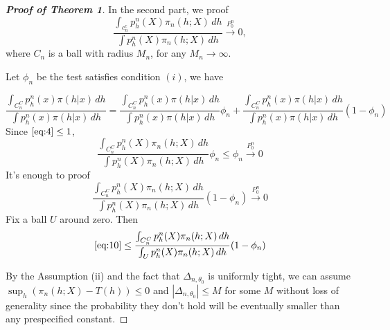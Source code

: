 \begin{proof}[\textbf{Proof of Theorem 1}]
In the second part, we proof
\begin{equation}\label{eq:4}
    \frac{\int_{c_n^c}p_h^n(X)\pi_n(h;X)\, dh}{\int p_h^n(X)\pi_n(h;X)\, dh}\xrightarrow{P_0^n}0,
\end{equation}
where $C_n$ is a ball with radius $M_n$, for any $M_n\to \infty$.
    
    Let $\phi_n$ be the test satisfies condition $(i)$, we have

\begin{equation}
    \frac{\int_{C_n^C}p_h^n(x)\pi(h|x)\, dh}{\int p_h^n(x)\pi(h|x)\, dh}= \frac{\int_{C_n^C}p_h^n(x)\pi(h|x)\, dh}{\int p_h^n(x)\pi(h|x)\, dh}\phi_n+ \frac{\int_{C_n^C}p_h^n(x)\pi(h|x)\, dh}{\int p_h^n(x)\pi(h|x)\, dh}(1-\phi_n)
\end{equation}
Since $\eqref{eq:4}\leq 1$, 
\begin{equation}
    \frac{\int_{C_n^C}p_h^n(X)\pi_n(h;X)\, dh}{\int p_h^n(X)\pi_n(h;X)\, dh}\phi_n\leq \phi_n\xrightarrow{P_0^n}0
\end{equation}
It's enough to proof
\begin{equation}\label{eq:10}
    \frac{\int_{C_n^C}p_h^n(X)\pi_n(h;X)\, dh}{\int p_h^n(X)\pi_n(h;X)\, dh}(1-\phi_n)\xrightarrow{P_0^n}0
\end{equation}
Fix a ball $U$ around zero. Then
\begin{equation}\label{eq:11}
\eqref{eq:10}\leq \frac{\int_{C_n^C}p_h^n(X)\pi_n(h;X)\, dh}{\int_U p_h^n(X)\pi_n(h;X)\, dh}(1-\phi_n)
\end{equation}

    By the Assumption (ii) and the fact that $\Delta_{n,\theta_0}$ is uniformly tight, we can assume $\sup_h (\pi_n(h;X)-T(h))\leq 0$ and $|\Delta_{n,\theta_0}|\leq M$ for some $M$ without loss of generality since the probability they don't hold will be eventually smaller than any prespecified constant. 


\end{proof}
